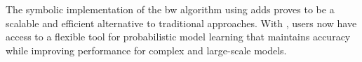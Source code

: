 \documentclass[a4paper,10pt]{article}
\begin{document}
The symbolic implementation of the \gls{bw} algorithm using \glspl{add} proves to be a scalable and efficient alternative to traditional approaches.
With \JajapyTwo, users now have access to a flexible tool for probabilistic model learning that maintains accuracy while improving performance for complex and large-scale models.
\end{document}
